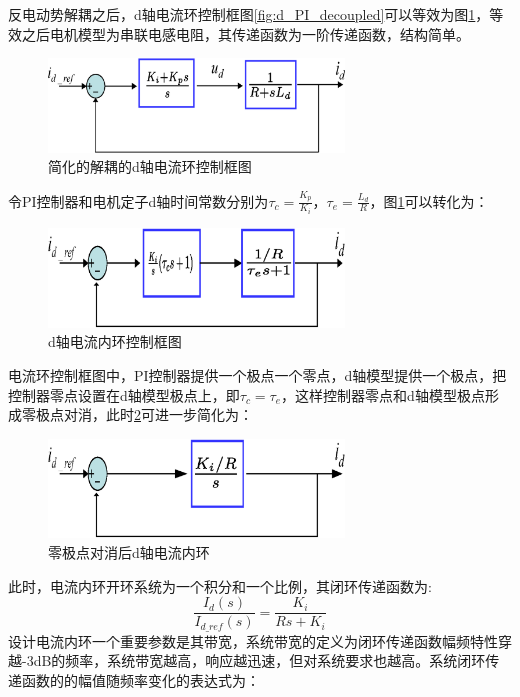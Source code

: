 反电动势解耦之后，d轴电流环控制框图\ref{fig:d_PI_decoupled}可以等效为图\ref{fig:d_PI_decoupled_simple}，等效之后电机模型为串联电感电阻，其传递函数为一阶传递函数，结构简单。
\begin{figure}[H]
	\centering
	\includegraphics[width=0.7\textwidth]{figs/d_PI_decoupled_simple.eps}
	\caption{简化的解耦的d轴电流环控制框图}
	\label{fig:d_PI_decoupled_simple}
\end{figure}
令PI控制器和电机定子d轴时间常数分别为$\tau_{c}=\frac{K_{p}}{K_{i}}$，$\tau_{e}=\frac{L_{d}}{R}$，图\ref{fig:d_PI_decoupled_simple}可以转化为：
\begin{figure}[H]
	\centering
	\includegraphics[width=0.7\textwidth]{figs/d_PI_time_const_format.eps}
	\caption{d轴电流内环控制框图}
	\label{fig:d_PI_time_const_format}
\end{figure}
电流环控制框图中，PI控制器提供一个极点一个零点，d轴模型提供一个极点，把控制器零点设置在d轴模型极点上，即$\tau_{c}=\tau_{e}$，这样控制器零点和d轴模型极点形成零极点对消，此时\ref{fig:d_PI_time_const_format}可进一步简化为：
\begin{figure}[H]
	\centering
	\includegraphics[width=0.7\textwidth]{figs/d_PI_simplest.eps}
	\caption{零极点对消后d轴电流内环}
	\label{fig:d_PI_simplest}
\end{figure}
此时，电流内环开环系统为一个积分和一个比例，其闭环传递函数为:
\begin{equation}
\frac{I_{d}(s)}{I_{d\_ref}(s)}=\frac{K_{i}}{Rs+K_{i}}
\end{equation}
设计电流内环一个重要参数是其带宽，系统带宽的定义为闭环传递函数幅频特性穿越-3dB的频率，系统带宽越高，响应越迅速，但对系统要求也越高。系统闭环传递函数的的幅值随频率变化的表达式为：
